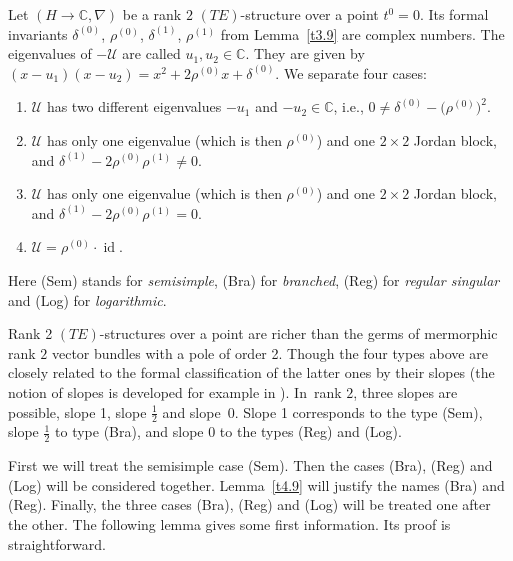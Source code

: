\documentclass[10pt,a4paper]{amsart}
\numberwithin{equation}{section}
\numberwithin{figure}{section}
\newcommand{\C}{{\mathbb C}}
\newcommand{\UU}{{\mathcal U}}
\newcommand{\nnn}{\nabla}
\DeclareMathOperator{\id}{id}
\begin{document}
\begin{Definition}%
Let $(H\to\C,\nnn)$ be a rank $2$ $(TE)$-structure
over a point $t^0=0$. Its formal invariants
$\delta^{(0)}$, $\rho^{(0)}$, $\delta^{(1)}$, $\rho^{(1)}$
from Lemma~\ref{t3.9} are complex numbers.
The eigenvalues of $-\UU$ are called $u_1,u_2\in\C$.
They are given by
$(x-u_1)(x-u_2)=x^2+2\rho^{(0)}x+\delta^{(0)}$.
We separate four cases:
\begin{enumerate}\itemsep=0pt\setlength{\leftskip}{0.3cm}
\item[(Sem)] $\UU$ has two different eigenvalues
$-u_1$ and $-u_2\in\C$, i.e.,
$0\neq \delta^{(0)}-\big(\rho^{(0)}\big)^2$.
\item[(Bra)] $\UU$ has only one eigenvalue
\big(which is then $\rho^{(0)}$\big)
and one $2\times 2$ Jordan block,
and $\delta^{(1)}-2\rho^{(0)}\rho^{(1)}\neq 0$.
\item[(Reg)] $\UU$ has only one eigenvalue
\big(which is then $\rho^{(0)}$\big)
and one $2\times 2$ Jordan block,
and $\delta^{(1)}-2\rho^{(0)}\rho^{(1)}= 0$.
\item[(Log)] $\UU=\rho^{(0)}\cdot\id$.
\end{enumerate}
Here (Sem) stands for {\it semisimple},
(Bra) for {\it branched}, (Reg) for {\it regular singular}
and (Log) for {\it logarithmic}.
\end{Definition}


\begin{Remark}\label{t4.2}
Rank 2 $(TE)$-structures over a point are richer than the
germs of mermorphic rank $2$ vector bundles with a pole of
order 2. Though the four types above are closely related
to the formal classification of the latter ones by their
slopes (the notion of slopes is developed for example in
\cite[Section~5]{Sa93}). In~rank $2$, three slopes are possible,
slope 1, slope $\frac{1}{2}$ and slope~0.
Slope 1 corresponds to the type (Sem), slope $\frac{1}{2}$
to type (Bra), and slope 0 to the types (Reg) and (Log).
\end{Remark}


First we will treat the semisimple case (Sem).
Then the cases (Bra), (Reg) and (Log)
will be considered together.
Lemma~\ref{t4.9} will justify the names (Bra) and (Reg).
Finally, the three cases (Bra), (Reg) and (Log) will be
treated one after the other.
The following lemma gives some first information.
Its proof is straightforward.
\end{document}
